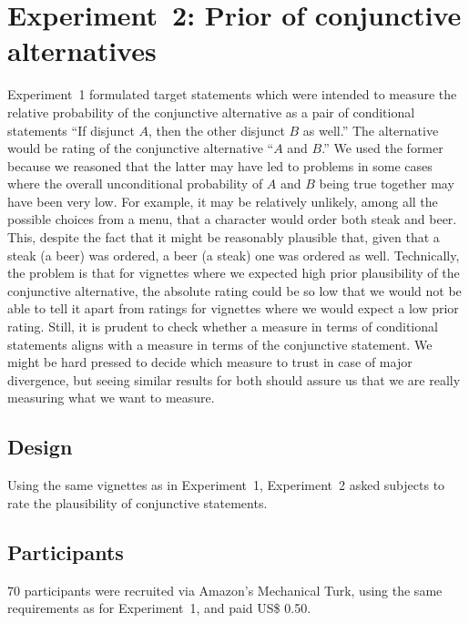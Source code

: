 \documentclass[12pt]{article}
\begin{document}
\section{Experiment~2: Prior of conjunctive alternatives}
\label{sec:experiment-2:-prior}


Experiment~1 formulated target statements which were intended to measure the relative
probability of the conjunctive alternative as a pair of conditional statements ``If disjunct
$A$, then the other disjunct $B$ as well.'' The alternative would be rating of the conjunctive
alternative ``$A$ and $B$.'' We used the former because we reasoned that the latter may have
led to problems in some cases where the overall unconditional probability of $A$ and $B$ being
true together may have been very low. For example, it may be relatively unlikely, among all the
possible choices from a menu, that a character would order both steak and beer. This, despite
the fact that it might be reasonably plausible that, given that a steak (a beer) was ordered, a
beer (a steak) one was ordered as well. Technically, the problem is that for vignettes where we
expected high prior plausibility of the conjunctive alternative, the absolute rating could be
so low that we would not be able to tell it apart from ratings for vignettes where we would
expect a low prior rating. Still, it is prudent to check whether a measure in terms of
conditional statements aligns with a measure in terms of the conjunctive statement. We might be
hard pressed to decide which measure to trust in case of major divergence, but seeing similar
results for both should assure us that we are really measuring what we want to measure.

\subsection*{Design}

Using the same vignettes as in Experiment~1, Experiment~2 asked subjects to rate the
plausibility of conjunctive statements.

\subsection*{Participants}

70 participants were recruited via Amazon's Mechanical Turk, using the same requirements as for
Experiment~1, and paid US\$ 0.50. 
\end{document}
